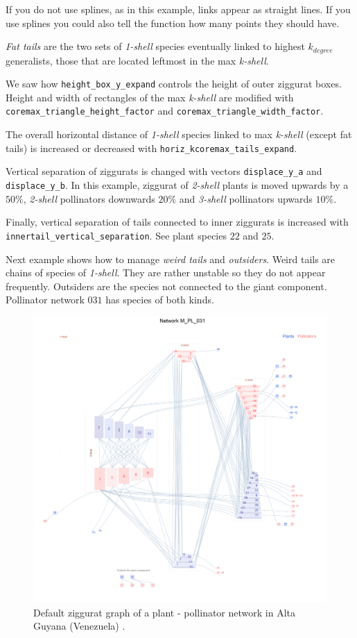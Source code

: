 \documentclass[11pt]{article}
\begin{document}
If you do not use splines, as in this example, links appear as straight lines. If you use splines you could also tell the function how many points they should have.

\textit{Fat tails} are the two sets of \textit{1-shell} species eventually linked to highest $k_{degree}$ generalists, those that are located
leftmost in the max \textit{k-shell}. 

We saw how \texttt{height\_box\_y\_expand} controls the height of outer ziggurat boxes. Height and width of rectangles of the max \textit{k-shell} are modified with \texttt{coremax\_triangle\_height\_factor} and \texttt{coremax\_triangle\_width\_factor}. 

The overall horizontal distance of \textit{1-shell} species linked to max \textit{k-shell} (except fat tails) is increased or decreased with
\texttt{horiz\_kcoremax\_tails\_expand}.

Vertical separation of ziggurats is changed with vectors \texttt{displace\_y\_a} and \texttt{displace\_y\_b}. In this example, ziggurat
of \textit{2-shell} plants is moved upwards by a $50\%$,  \textit{2-shell} pollinators downwards $20\%$ and  \textit{3-shell} pollinators upwards $10\%$.

Finally, vertical separation of tails connected to inner ziggurats is increased with \texttt{innertail\_vertical\_separation}. See plant
species $22$ and $25$.

Next example shows how to manage \textit{weird tails} and \textit{outsiders}. Weird tails are chains of species of \textit{1-shell}. They
are rather unstable so they do not appear frequently. Outsiders are the species not connected to the giant component. Pollinator network $031$
has species of both kinds.

\clearpage
\begin{figure}[hp!]
\centering
\includegraphics[scale=0.45]{M_PL_031_ziggurat.png}
\caption {Default ziggurat graph of a plant - pollinator network in Alta Guyana (Venezuela) \cite{ramirez1989biologia}.}
\label{fig:KMAN_ziggurat_031}
\end{figure}
\end{document}
